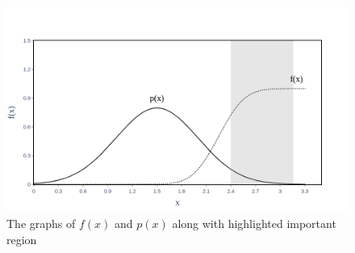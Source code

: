     \begin{figure}[H]
        \centering
        \includegraphics[scale=0.30]{Figures/Images/Illustrative Example/f&p.png}
        \caption{The graphs of $f(x)$ and $p(x)$ along with highlighted important region}
        \label{fig:f&p}
    \end{figure}